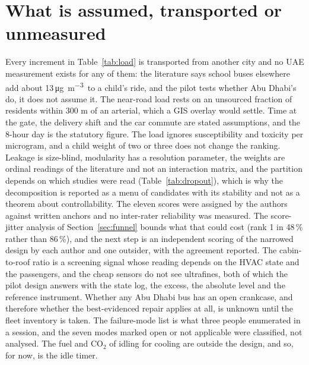 \documentclass[10pt,a4paper]{article}
\newcommand{\ugm}{\si{\micro\gram\per\cubic\metre}}
\begin{document}
\section{What is assumed, transported or unmeasured}\label{sec:limits}
Every increment in Table~\ref{tab:load} is transported from another city and no UAE measurement exists for any of them: the literature says school buses elsewhere add about 13\,\ugm\ to a child's ride, and the pilot tests whether Abu Dhabi's do, it does not assume it. The near-road load rests on an unsourced fraction of residents within 300 m of an arterial, which a GIS overlay would settle. Time at the gate, the delivery shift and the car commute are stated assumptions, and the 8-hour day is the statutory figure. The load ignores susceptibility \citep{Gauderman2004,Gauderman2007} and toxicity per microgram, and a child weight of two or three does not change the ranking. Leakage is size-blind, modularity has a resolution parameter, the weights are ordinal readings of the literature and not an interaction matrix, and the partition depends on which studies were read (Table~\ref{tab:dropout}), which is why the decomposition is reported as a menu of candidates with its stability and not as a theorem about controllability. The eleven scores were assigned by the authors against written anchors and no inter-rater reliability was measured. The score-jitter analysis of Section~\ref{sec:funnel} bounds what that could cost (rank 1 in 48\,\% rather than 86\,\%), and the next step is an independent scoring of the narrowed design by each author and one outsider, with the agreement reported. The cabin-to-roof ratio is a screening signal whose reading depends on the HVAC state and the passengers, and the cheap sensors do not see ultrafines, both of which the pilot design answers with the state log, the excess, the absolute level and the reference instrument. Whether any Abu Dhabi bus has an open crankcase, and therefore whether the best-evidenced repair applies at all, is unknown until the fleet inventory is taken. The failure-mode list is what three people enumerated in a session, and the seven modes marked open or not applicable were classified, not analysed. The fuel and CO\(_2\) of idling for cooling are outside the design, and so, for now, is the idle timer.
\end{document}
